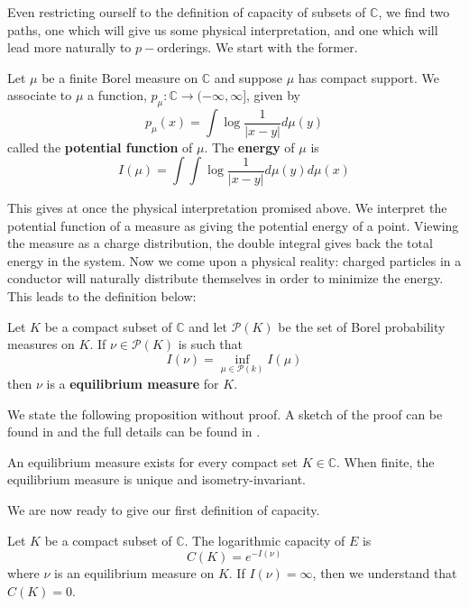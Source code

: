 Even restricting ourself to the definition of capacity of subsets of $\mathbb{C}$, we find two paths, one which will give us some physical interpretation, and one which will lead more naturally to $p-$orderings. We start with the former.\\

\begin{definition} 
\cite{rand2} Let $\mu$ be a finite Borel measure on $\mathbb{C}$ and suppose $\mu$ has compact support.  We associate to $\mu$ a function, $p_{\mu}:\mathbb{C} \rightarrow (-\infty, \infty]$, given by
\[p_\mu (x) =\int \log \frac{1}{\lvert x - y \rvert} d\mu(y)\] called the \textbf{potential function} of $\mu$. The \textbf{energy} of $\mu$ is 
\[I(\mu) =\int \int \log \frac{1}{\lvert x - y \rvert} d\mu(y) d\mu(x)\]
\end{definition}

This gives at once the physical interpretation promised above. We interpret the potential function of a measure as giving the potential energy of a point. Viewing the measure as a charge distribution, the double integral gives back the total energy in the system. Now we come upon a physical reality: charged particles in a conductor will naturally distribute themselves in order to minimize the energy. This leads to the definition below:\\

\begin{definition}
\cite{rand2} Let $K$ be a compact subset of $\mathbb{C}$ and let $\mathcal{P}(K)$ be the set of Borel probability measures on $K$. If $\nu \in \mathcal{P}(K)$ is such that 
\[I(\nu) = \inf_{\mu \in \mathcal{P}(k)} I(\mu)\] then $\nu$ is a \textbf{equilibrium measure} for $K$.
\end{definition}

We state the following proposition without proof. A sketch of the proof can be found in \cite{fp} and the full details can be found in \cite{rand}.\\

\begin{proposition}
\cite{rand} An equilibrium measure exists for every compact set $K \in \mathbb{C}$. When finite, the equilibrium measure is unique and isometry-invariant.
\end{proposition}

We are now ready to give our first definition of capacity.\\

\begin{definition}
\cite{rand2} Let $K$ be a compact subset of $\mathbb{C}$. The logarithmic capacity of $E$ is 
\[C(K) = e^{-I(\nu)}\] where $\nu$ is an equilibrium measure on $K$. If $I(\nu)=\infty$, then we understand that $C(K) =0$.
\end{definition}

